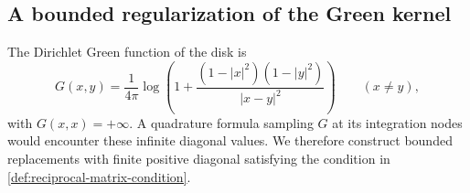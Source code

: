 \subsection{A bounded regularization of the Green kernel}

The Dirichlet Green function of the disk is
\[
 G(x,y)=\frac1{4\pi}\log\left(
  1+\frac{(1-|x|^2)(1-|y|^2)}{|x-y|^2}\right)
 \qquad(x\ne y),
\]
with $G(x,x)=+\infty$. A quadrature formula sampling $G$ at its
integration nodes would encounter these infinite diagonal values.
We therefore construct bounded replacements with finite positive
diagonal satisfying the condition in
\cref{def:reciprocal-matrix-condition}.

